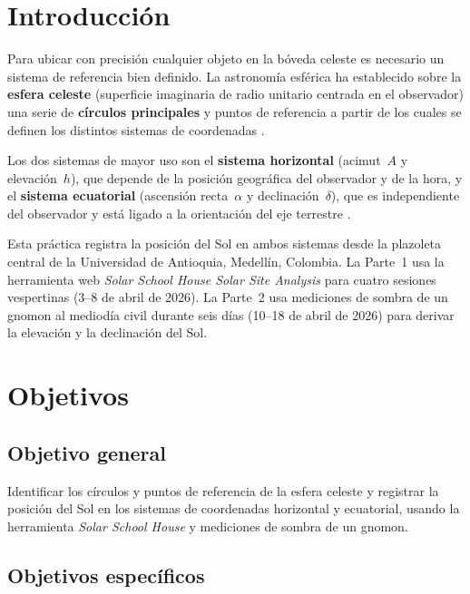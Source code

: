 \section{Introducción}

Para ubicar con precisión cualquier objeto en la bóveda celeste es necesario un sistema
de referencia bien definido.
La astronomía esférica ha establecido sobre la \textbf{esfera celeste} (superficie
imaginaria de radio unitario centrada en el observador) una serie de
\textbf{círculos principales} y puntos de referencia a partir de los cuales se definen
los distintos sistemas de coordenadas \citep{PortillaBarbosa2009}.

Los dos sistemas de mayor uso son el \textbf{sistema horizontal} (acimut~$A$ y
elevación~$h$), que depende de la posición geográfica del observador y de la hora, y el
\textbf{sistema ecuatorial} (ascensión recta~$\alpha$ y declinación~$\delta$), que es
independiente del observador y está ligado a la orientación del eje terrestre
\citep{Karttunen2007}.

Esta práctica registra la posición del Sol en ambos sistemas desde la plazoleta central
de la Universidad de Antioquia, Medellín, Colombia.
La Parte~1 usa la herramienta web \textit{Solar School House Solar Site Analysis}
\citep{SolarSchoolHouse2026} para cuatro sesiones vespertinas (3--8 de abril de 2026).
La Parte~2 usa mediciones de sombra de un gnomon al mediodía civil durante seis días
(10--18 de abril de 2026) para derivar la elevación y la declinación del Sol.

\section{Objetivos}

\subsection{Objetivo general}

Identificar los círculos y puntos de referencia de la esfera celeste y registrar la
posición del Sol en los sistemas de coordenadas horizontal y ecuatorial, usando la
herramienta \textit{Solar School House} y mediciones de sombra de un gnomon.

\subsection{Objetivos específicos}

